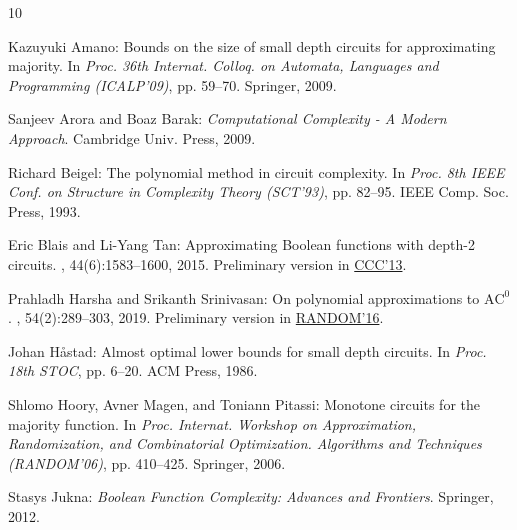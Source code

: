 \documentclass[11pt]{article}
\numberwithin{equation}{section}
\theoremstyle{definition}
\theoremstyle{plain}
\begin{document}
\tocrefpdfbookmark
\begin{thebibliography}{10}

{\sc Kazuyuki Amano}: Bounds on the size of small depth circuits for
  approximating majority.
\newblock In {\em Proc. 36th Internat. Colloq. on Automata, Languages and
  Programming (ICALP'09)}, pp. 59--70. Springer, 2009.
\newblock [\epfmtdoi{10.1007/978-3-642-02927-1\_7}]

{\sc Sanjeev Arora and Boaz Barak}: {\em Computational Complexity - {A} Modern
  Approach}.
\newblock Cambridge Univ. Press, 2009.

{\sc Richard Beigel}: The polynomial method in circuit complexity.
\newblock In {\em Proc. 8th IEEE Conf. on Structure in Complexity Theory
  (SCT'93)}, pp. 82--95. IEEE Comp. Soc. Press, 1993.

{\sc Eric Blais and Li{-}Yang Tan}: Approximating {B}oolean functions with
  depth-2 circuits.
, 44(6):1583--1600, 2015.
\newblock Preliminary version in
  \href{http://doi.org/10.1109/CCC.2013.17}{CCC'13}.
\newblock [\epfmtdoi{10.1137/14097402X}]

{\sc Prahladh Harsha and Srikanth Srinivasan}: On polynomial approximations to
  {$\mathrm{AC}^0$}.
, 54(2):289--303, 2019.
\newblock Preliminary version in
  \href{http://doi.org/10.4230/LIPIcs.APPROX-RANDOM.2016.32}{RANDOM'16}.

{\sc Johan H{\aa}stad}: Almost optimal lower bounds for small depth circuits.
\newblock In {\em Proc. 18th STOC}, pp. 6--20. ACM Press, 1986.
\newblock [\epfmtdoi{10.1145/12130.12132}]

{\sc Shlomo Hoory, Avner Magen, and Toniann Pitassi}: Monotone circuits for the
  majority function.
\newblock In {\em Proc. Internat. Workshop on Approximation, Randomization, and
  Combinatorial Optimization. Algorithms and Techniques (RANDOM'06)}, pp.
  410--425. Springer, 2006.
\newblock [\epfmtdoi{10.1007/11830924\_38}]

{\sc Stasys Jukna}: {\em Boolean Function Complexity: Advances and Frontiers}.
\newblock Springer, 2012.
\newblock [\epfmtdoi{10.1007/978-3-642-24508-4}]


\end{thebibliography}
\end{document}
